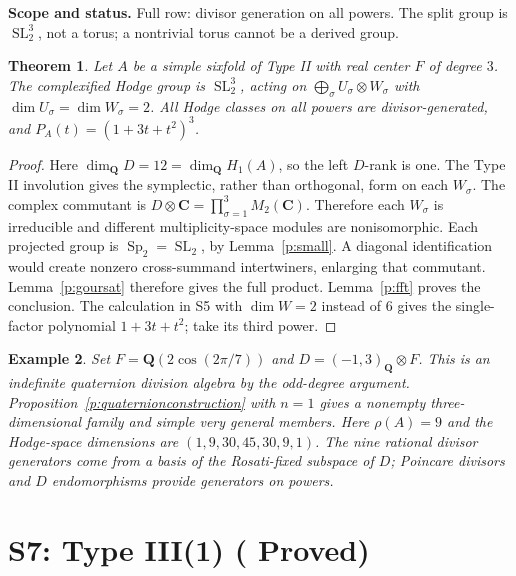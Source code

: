 \documentclass[10pt,reqno]{article}
\theoremstyle{emphasizedplain}
\DeclareRobustCommand{\provedstatus}{%
  \texorpdfstring{\textcolor{ProvedGreen}{\textbf{Proved}}}{Proved}}
\newtheorem{theorem}{Theorem}[section]
\theoremstyle{emphasizeddefinition}
\newtheorem{example}[theorem]{Example}
\theoremstyle{emphasizeddefinition}
\DeclareMathOperator{\Sp}{Sp}
\DeclareMathOperator{\SL}{SL}
\newcommand{\Q}{\mathbf Q}
\newcommand{\C}{\mathbf C}
\newcommand{\status}[1]{%
  \par\nobreak\smallskip\noindent
  {\setlength{\fboxsep}{7pt}%
   \colorbox{ScopeBackground}{%
    \parbox{\dimexpr\linewidth-2\fboxsep\relax}{%
     \small\textbf{\textcolor{HeadingInk}{Scope and status.}} #1}}}%
  \par\nobreak\medskip}
\renewcommand{\small}{\fontsize{8.4}{10}\selectfont}
\begin{document}
\status{Full row: divisor generation on all powers. The split group is
$\SL_2^3$, not a torus; a nontrivial torus cannot be a derived group.}
\begin{theorem}
Let $A$ be a simple sixfold of Type II with real center $F$ of degree $3$.
The complexified Hodge group is $\SL_2^3$, acting on
$\bigoplus_\sigma U_\sigma\otimes W_\sigma$ with
$\dim U_\sigma=\dim W_\sigma=2$. All Hodge classes on all powers are
divisor-generated, and $P_A(t)=(1+3t+t^2)^3$.
\end{theorem}
\begin{proof}
Here $\dim_\Q D=12=\dim_\Q H_1(A)$, so the left $D$-rank is one.
The Type II involution gives the symplectic, rather than orthogonal,
form on each $W_\sigma$. The complex commutant is
$D\otimes\C=\prod_{\sigma=1}^3M_2(\C)$.
Therefore each $W_\sigma$ is irreducible and different multiplicity-space
modules are nonisomorphic. Each projected group is $\Sp_2=\SL_2$, by
Lemma~\ref{p:small}. A diagonal identification would create nonzero
cross-summand intertwiners, enlarging that commutant. Lemma~\ref{p:goursat}
therefore gives the full product. Lemma~\ref{p:fft} proves the conclusion.
The calculation in S5 with $\dim W=2$ instead of $6$ gives the single-factor
polynomial $1+3t+t^2$; take its third power.
\end{proof}
\begin{example}
Set $F=\Q(2\cos(2\pi/7))$ and $D=(-1,3)_\Q\otimes F$. This is an
indefinite quaternion division algebra by the odd-degree argument.
Proposition~\ref{p:quaternionconstruction} with $n=1$ gives a nonempty
three-dimensional family and simple very general members.
Here $\rho(A)=9$ and the Hodge-space dimensions are
$(1,9,30,45,30,9,1)$. The nine rational divisor generators come from a
basis of the Rosati-fixed subspace of $D$; Poincare divisors and $D$
endomorphisms provide generators on powers.
\end{example}
\section{S7: Type III(1) (\provedstatus)}\label{sec:S7}
\end{document}
